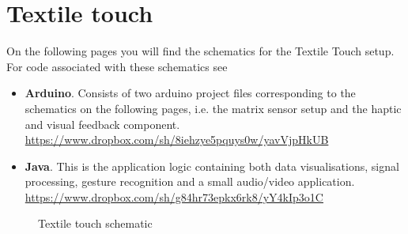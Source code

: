 \section{Textile touch}
\label{app:textile-touch}

On the following pages you will find the schematics for the Textile Touch setup.
For code associated with these schematics see
\begin{itemize}
	\item{\textbf{Arduino}. Consists of two arduino project files corresponding to the schematics on the following pages, i.e. the matrix sensor setup and the haptic and visual feedback component.\\
		\url{https://www.dropbox.com/sh/8iehzye5pquys0w/yavVjpHkUB} } 
	\item{\textbf{Java}. This is the application logic containing both data visualisations, signal processing, gesture recognition and a small audio/video application.\\
	 \url{https://www.dropbox.com/sh/g84hr73epkx6rk8/yY4kIp3o1C} } 
\end{itemize}

\begin{landscape}
	\thispagestyle{empty}
	\centering
	\begin{figure}[p]
	    \caption{Textile touch schematic}
	\end{figure}
\end{landscape}

